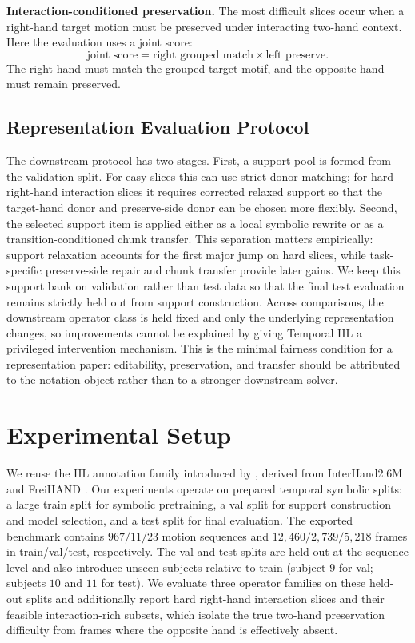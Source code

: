 \documentclass[letterpaper]{article}
\newcommand{\thl}{Temporal HL}
\begin{document}
\textbf{Interaction-conditioned preservation.}
The most difficult slices occur when a right-hand target motion must be
preserved under interacting two-hand context. Here the evaluation uses a joint score:
\[
\text{joint score} = \text{right grouped match} \times \text{left preserve}.
\]
The right hand must match the grouped target motif, and the opposite hand must
remain preserved.

\subsection{Representation Evaluation Protocol}

The downstream protocol has two stages. First, a support pool is formed from the
validation split. For easy slices this can use strict donor matching; for hard
right-hand interaction slices it requires corrected relaxed support so that the
target-hand donor and preserve-side donor can be chosen more flexibly. Second,
the selected support item is applied either as a local symbolic rewrite or as a
transition-conditioned chunk transfer. This separation matters empirically:
support relaxation accounts for the first major jump on hard slices, while
task-specific preserve-side repair and chunk transfer provide later gains. We
keep this support bank on validation rather than test data so that the final
test evaluation remains strictly held out from support construction.
Across comparisons, the downstream operator class is held fixed and only the
underlying representation changes, so improvements cannot be explained by giving
\thl{} a privileged intervention mechanism. This is the minimal fairness
condition for a representation paper: editability, preservation, and transfer
should be attributed to the notation object rather than to a stronger
downstream solver.

\section{Experimental Setup}

We reuse the HL annotation family introduced by \citet{li2024hl}, derived from
InterHand2.6M and FreiHAND \citep{moon2020interhand,zimmermann2019freihand}.
Our experiments operate on prepared temporal symbolic splits: a large train
split for symbolic pretraining, a val split for support construction and model
selection, and a test split for final evaluation. The exported benchmark contains $967/11/23$ motion sequences and
$12{,}460/2{,}739/5{,}218$ frames in train/val/test, respectively. The val and
test splits are held out at the sequence level and also introduce unseen
subjects relative to train (subject $9$ for val; subjects $10$ and $11$ for
test). We evaluate three operator families on these held-out splits and
additionally report hard right-hand interaction slices and their
feasible interaction-rich subsets, which isolate the true two-hand preservation
difficulty from frames where the opposite hand is effectively absent.
\end{document}
